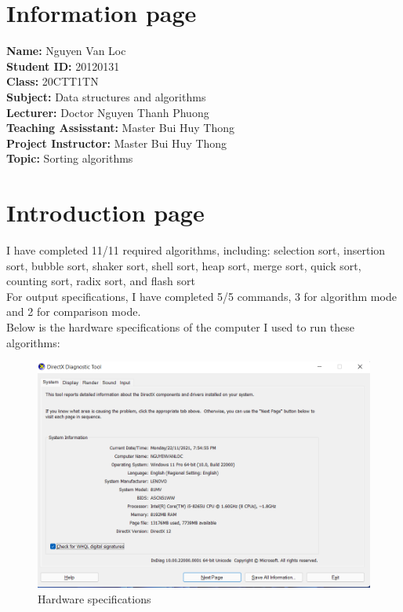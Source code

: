 \documentclass[12pt,a4paper]{article}
\begin{document}
\section{Information page}
\textbf{Name:} Nguyen Van Loc\\
\textbf{Student ID:} 20120131\\
\textbf{Class:} 20CTT1TN\\
\textbf{Subject:} Data structures and algorithms\\
\textbf{Lecturer:} Doctor Nguyen Thanh Phuong\\
\textbf{Teaching Assisstant:} Master Bui Huy Thong\\
\textbf{Project Instructor:} Master Bui Huy Thong\\
\textbf{Topic:} Sorting algorithms

\newpage

\section{Introduction page}
I have completed 11/11 required algorithms, including: selection sort, insertion sort, bubble sort, shaker sort, shell sort, heap sort, merge sort, quick sort, counting sort, radix sort, and flash sort\\
For output specifications, I have completed 5/5 commands, 3 for algorithm mode and 2 for comparison mode.\\
Below is the hardware specifications of the computer I used to run these algorithms:
\begin{figure}[H]
\begin{center}
\includegraphics[scale=0.75]{hardware}
\end{center}
\caption{Hardware specifications}
\end{figure}
\end{document}
